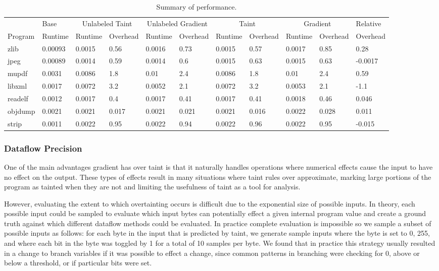\begin{table}[t]
\begin{tabular}{@{}lllllllllll@{}}
\toprule
  & Base & \multicolumn{2}{c}{Unlabeled Taint} & \multicolumn{2}{c}{Unlabeled Gradient} & \multicolumn{2}{c}{Taint} & \multicolumn{2}{c}{Gradient} & Relative\\

  Program & Runtime & Runtime & Overhead & Runtime & Overhead & Runtime & Overhead & Runtime & Overhead & Overhead \\ 
\midrule
zlib & 0.00093 & 0.0015 & 0.56 & 0.0016 & 0.73 & 0.0015 & 0.57 & 0.0017 & 0.85 & 0.28 \\
jpeg & 0.00089 & 0.0014 & 0.59 & 0.0014 & 0.6 & 0.0015 & 0.63 & 0.0015 & 0.63 & -0.0017 \\
mupdf & 0.0031 & 0.0086 & 1.8 & 0.01 & 2.4 & 0.0086 & 1.8 & 0.01 & 2.4 & 0.59 \\
libxml & 0.0017 & 0.0072 & 3.2 & 0.0052 & 2.1 & 0.0072 & 3.2 & 0.0053 & 2.1 & -1.1 \\
readelf & 0.0012 & 0.0017 & 0.4 & 0.0017 & 0.41 & 0.0017 & 0.41 & 0.0018 & 0.46 & 0.046 \\
objdump & 0.0021 & 0.0021 & 0.017 & 0.0021 & 0.021 & 0.0021 & 0.016 & 0.0022 & 0.028 & 0.011 \\
strip & 0.0011 & 0.0022 & 0.95 & 0.0022 & 0.94 & 0.0022 & 0.96 & 0.0022 & 0.95 & -0.015\\ \bottomrule
\end{tabular}
 \label{tab:performance}
 \caption{Summary of performance. }
\end{table}




\subsubsection{Dataflow Precision}

One of the main advantages gradient has over taint is that it naturally handles operations where numerical effects cause the input to have no effect on the output. These types of effects result in many situations where taint rules over approximate, marking large portions of the program as tainted when they are not and limiting the usefulness of taint as a tool for analysis. 

However, evaluating the extent to which overtainting occurs is difficult due to the exponential size of possible inputs. In theory, each possible input could be sampled to evaluate which input bytes can potentially effect a given internal program value and create a ground truth against which different dataflow methods could be evaluated. In practice complete evaluation is impossible so we sample a subset of possible inputs as follows: for each byte in the input that is predicted by taint, we generate sample inputs where the byte is set to 0, 255, and where each bit in the byte was toggled by 1 for a total of 10 samples per byte. We found that in practice this strategy usually resulted in a change to branch variables if it was possible to effect a change, since common patterns in branching were checking for 0, above or below a threshold, or if particular bits were set.

